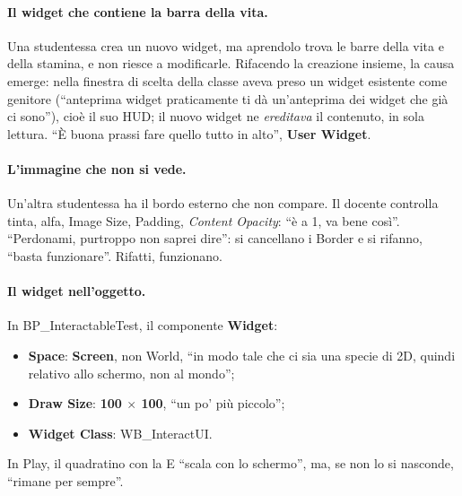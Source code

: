 \paragraph{Il widget che contiene la barra della vita.} Una studentessa crea un nuovo
widget, ma aprendolo trova le barre della vita e della stamina, e non riesce a modificarle.
Rifacendo la creazione insieme, la causa emerge: nella finestra di scelta della classe aveva
preso un widget esistente come genitore (``anteprima widget praticamente ti dà
un'anteprima dei widget che già ci sono''), cioè il suo HUD; il nuovo widget ne
\emph{ereditava} il contenuto, in sola lettura. ``È buona prassi fare quello tutto in
alto'', \textbf{User Widget}.

\paragraph{L'immagine che non si vede.} Un'altra studentessa ha il bordo esterno che non
compare. Il docente controlla tinta, alfa, Image Size, Padding, \emph{Content Opacity}: ``è
a 1, va bene così''. ``Perdonami, purtroppo non saprei dire'': si cancellano i Border e si
rifanno, ``basta funzionare''. Rifatti, funzionano.

\paragraph{Il widget nell'oggetto.} In BP\_InteractableTest, il componente \textbf{Widget}:
\begin{itemize}
  \item \textbf{Space}: \textbf{Screen}, non World, ``in modo tale che ci sia una specie di
        2D, quindi relativo allo schermo, non al mondo'';
  \item \textbf{Draw Size}: \textbf{100 $\times$ 100}, ``un po' più piccolo'';
  \item \textbf{Widget Class}: WB\_InteractUI.
\end{itemize}
In Play, il quadratino con la E ``scala con lo schermo'', ma, se non lo si nasconde,
``rimane per sempre''.

